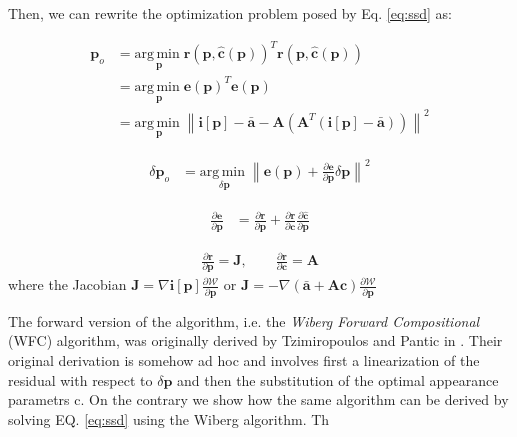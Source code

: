 Then, we can rewrite the optimization problem posed by Eq. \ref{eq:ssd} as:

\begin{equation}
    \begin{aligned}
        \mathbf{p}_o & = \underset{\mathbf{p}}{\mathrm{arg\,min\;}} \mathbf{r}(\mathbf{p}, \hat{\mathbf{c}}(\mathbf{p}))^T\mathbf{r}(\mathbf{p}, \hat{\mathbf{c}}(\mathbf{p}))
        \\
        & = \underset{\mathbf{p}}{\mathrm{arg\,min\;}} \mathbf{e}(\mathbf{p})^T\mathbf{e}(\mathbf{p})
        \\
        & = \underset{\mathbf{p}}{\mathrm{arg\,min\;}}  \left\| \mathbf{i}[\mathbf{p}] - \bar{\mathbf{a}} - \mathbf{A} \left( \mathbf{A}^T \left( \mathbf{i}[\mathbf{p}] - \bar{\mathbf{a}} \right) \right) \right\|^2
    \label{eq:ssd_appearance}
    \end{aligned}
\end{equation}

\begin{equation}
    \begin{aligned}
        \delta\mathbf{p}_o & = \underset{\delta\mathbf{p}}{\mathrm{arg\,min\;}}  \left\| \mathbf{e}(\mathbf{p}) + \frac{\partial\mathbf{e}}{\partial\mathbf{p}} \delta\mathbf{p} \right\|^2
    \label{eq:ssd_appearance}
    \end{aligned}
\end{equation}

\begin{equation}
    \begin{aligned}
        \frac{\partial\mathbf{e}}{\partial\mathbf{p}} & = \frac{\partial\mathbf{r}}{\partial\mathbf{p}} + \frac{\partial\mathbf{r}}{\partial\mathbf{c}} \frac{\partial\hat{\mathbf{c}}}{\partial\mathbf{p}} 
    \label{eq:ssd_appearance}
    \end{aligned}
\end{equation}

\begin{equation}
    \begin{aligned}
        \frac{\partial\mathbf{r}}{\partial\mathbf{p}} = \mathbf{J}, \qquad \frac{\partial\mathbf{r}}{\partial\mathbf{c}} = \mathbf{A}  
    \label{eq:ssd_appearance}
    \end{aligned}
\end{equation}
where the Jacobian $\mathbf{J} = \nabla\mathbf{i}[\mathbf{p}] \frac{\partial\mathcal{W}}{\partial\mathbf{p}}$ or $\mathbf{J} = -\nabla \left( \bar{\mathbf{a}} + \mathbf{A}\mathbf{c} \right) \frac{\partial\mathcal{W}}{\partial\mathbf{p}}$


The forward version of the algorithm, i.e. the \emph{Wiberg Forward Compositional} (WFC) algorithm, was originally derived by Tzimiropoulos and Pantic in \cite{Tzimiropoulos2013}. Their original derivation is somehow ad hoc and involves first a linearization of the residual with respect to $\delta \mathbf{p}$ and then the substitution of the optimal appearance parametrs c. On the contrary we show how the same algorithm can be derived by solving EQ. \ref{eq:ssd} using the Wiberg algorithm. Th


